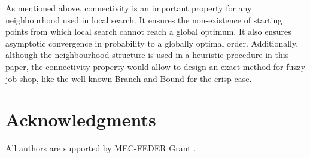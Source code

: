 \documentclass[preprint]{elsarticle}
\begin{document}
As mentioned above, connectivity is an important property for any neighbourhood used in local search. It ensures the non-existence of starting points from which local search cannot reach a global optimum. It also ensures asymptotic convergence in probability to a globally optimal order. Additionally, although the neighbourhood structure is used in a heuristic procedure in this paper, the connectivity property would allow to design an exact method for fuzzy job shop, like the well-known Branch and Bound for the crisp case.


\section*{ Acknowledgments}
All authors are supported by MEC-FEDER Grant .



\end{document}

